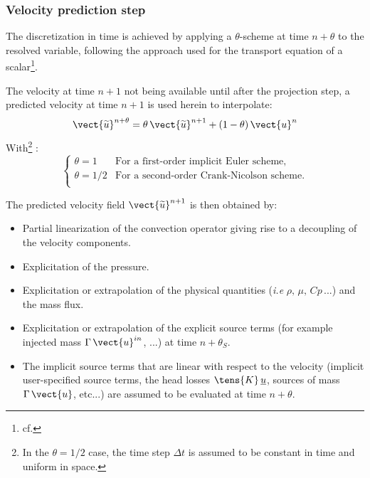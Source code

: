 \subsubsection*{Velocity prediction step}
The discretization in time is achieved by applying a $\theta$-scheme
at time $n+\theta$ to the resolved variable, following the approach used
for the transport equation of a scalar\footnote{cf. }.

The velocity at time $n+1$ not being available until after the projection
step, a predicted velocity at time $n+1$ is used herein to interpolate:
\begin{equation}
\label{eq:navstv:theta_scheme}
\vect{\widetilde{u}}^{n+\theta} = \theta\, {\vect{\widetilde{u}}}^{n+1}+(1-\theta)\, \vect{u}^{n}
\end{equation}
With\footnote{In the $\theta = 1/2$ case, the time step $\Delta t$ is assumed
to be constant in time and uniform in space.} :
\begin{equation}
\left\{
\begin{array}{ll}
\theta = 1   & \text{For a first-order implicit Euler scheme,}\\
\theta = 1/2 & \text{For a second-order Crank-Nicolson scheme.}\\
\end{array}
\right.
\end{equation}

The predicted velocity field ${\vect{\widetilde{u}}^{n+1}}$ is then
obtained by:

\begin{itemize}
\item Partial linearization of the convection operator giving rise to a
decoupling of the velocity components.
\item Explicitation of the pressure.
\item Explicitation or extrapolation of the physical quantities (\emph{i.e}
$\rho,\,\mu,\,Cp\,...$) and the mass flux.
\item Explicitation or extrapolation of the explicit source terms
(for example
injected mass $\Gamma\,\vect{u}^{in}$, ...)
at time $n+\theta_{S}$.
\item The implicit source terms that are linear with respect to the velocity
(implicit user-specified source terms, the head losses
$\tens{K}\,\underline{u}$, sources of mass $\Gamma\,\vect{u}$, etc...)
are assumed to be evaluated at time $n+\theta$.
\end{itemize}

